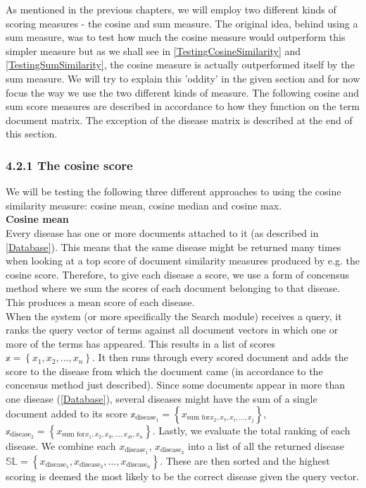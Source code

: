 As mentioned in the previous chapters, we will employ two different kinds of scoring measures - the cosine and sum measure. The original idea, behind using a sum measure, was to test how much the cosine measure would outperform this simpler measure but as we shall see in \ref{TestingCosineSimilarity} and \ref{TestingSumSimilarity}, the cosine measure is actually outperformed itself by the sum measure. We will try to explain this 'oddity' in the given section and for now focus the way we use the two different kinds of measure. The following cosine and sum score measures are described in accordance to how they function on the term document matrix. The exception of the disease matrix is described at the end of this section.

\subsubsection{4.2.1 The cosine score\label{CosineScore}}

We will be testing the following three different approaches to using
the cosine similarity measure: cosine mean, cosine median and cosine
max.\\

\textbf{Cosine mean}  \\
Every disease has one or more documents attached to it (as
described in \ref{Database}). This means that the same disease might
be returned many times when looking at a top score of document
similarity measures produced by e.g. the cosine score. Therefore, to
give each disease a score, we use a form of concensus method where we
sum the scores of each document belonging to that disease. This
produces a mean score of each disease. \\

When the system (or more specifically the Search module) receives a
query, it ranks the query vector of terms against all document vectors
in which one or more of the terms has appeared. This results in a list
of scores $\mathbb{x} = \left\{x_1, x_2, \dots, x_n \right\}$. It then
runs through every scored document and adds the score to the disease
from which the document came (in accordance to the concensus method
just described). Since some documents appear in more than one disease
(\ref{Database}), several diseases might have the sum of a single
document added to its score $\mathbb{x}_{\textrm{disease}_{1}} =
\left\{x_{\textrm{sum for} x_2, x_7, x_i, \dots, x_j}\right\}$,
$\mathbb{x}_{\textrm{disease}_{2}} = \left\{x_{\textrm{sum for} x_1,
  x_2, x_9, \dots, x_47, x_n}\right\}$.  Lastly, we evaluate the total
ranking of each disease. We combine each $x_{\textrm{disease}_1}$,
$x_{\textrm{disease}_2}$ into a list of all the returned disease
$\mathbb{SL} = \left\{x_{\textrm{disease}_1},x_{\textrm{disease}_2},
\dots, x_{\textrm{disease}_n}\right\}$. These are then sorted and the
highest scoring is deemed the most likely to be the correct disease
given the query vector. \\

